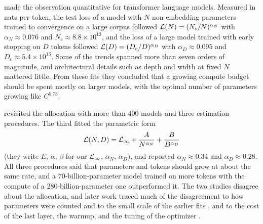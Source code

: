 \begin{refsection}
\Textcite{KaplanEtAl2020} made the observation quantitative for transformer language models. Measured in nats per token, the test loss of a model with $N$ non-embedding parameters trained to convergence on a large corpus followed $\mathcal{L}(N)=(N_c/N)^{\alpha_N}$ with $\alpha_N\approx0.076$ and $N_c\approx8.8\times10^{13}$, and the loss of a large model trained with early stopping on $D$ tokens followed $\mathcal{L}(D)=(D_c/D)^{\alpha_D}$ with $\alpha_D\approx0.095$ and $D_c\approx5.4\times10^{13}$. Some of the trends spanned more than seven orders of magnitude, and architectural details such as depth and width at fixed $N$ mattered little. From these fits they concluded that a growing compute budget should be spent mostly on larger models, with the optimal number of parameters growing like $C^{0.73}$.

\Textcite{HoffmannEtAl2022} revisited the allocation with more than $400$ models and three estimation procedures. The third fitted the parametric form
\begin{equation}\label{eq:scaling:chinchilla}
  \mathcal{L}(N,D)=\mathcal{L}_\infty+\frac A{N^{\alpha_N}}+\frac B{D^{\alpha_D}}
\end{equation}
(they write $E$, $\alpha$, $\beta$ for our $\mathcal{L}_\infty$, $\alpha_N$, $\alpha_D$), and reported $\alpha_N\approx0.34$ and $\alpha_D\approx0.28$. All three procedures said that parameters and tokens should grow at about the same rate, and a $70$-billion-parameter model trained on more tokens with the compute of a $280$-billion-parameter one outperformed it. The two studies disagree about the allocation, and later work traced much of the disagreement to how parameters were counted and to the small scale of the earlier fits \parencite{PearceSong2024}, and to the cost of the last layer, the warmup, and the tuning of the optimizer \parencite{PorianEtAl2024}.



\end{refsection}
